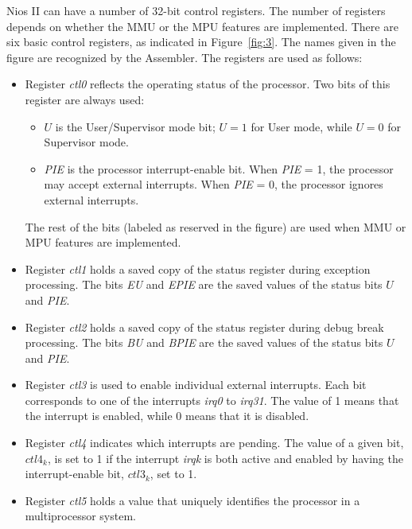\documentclass[11pt, twoside, pdftex]{article}
\begin{document}
Nios II can have a number of 32-bit control registers. The number of registers depends on 
whether the MMU or the MPU features are implemented. 
There are six basic control registers, as indicated in Figure~\ref{fig:3}. The names given in
the figure are recognized by the Assembler. 
The registers are used as follows:
\begin{itemize}
\item Register {\it ctl0} reflects the operating status of the processor.
Two bits of this register are always used:
\begin{itemize}
\item $U$ is the User/Supervisor mode bit; 
$U = 1$ for User mode, while $U = 0$ for Supervisor mode. 
\item {\it PIE} is the processor interrupt-enable bit. When {\it PIE} = 1, the processor
may accept external interrupts. When {\it PIE} = 0, the processor ignores external interrupts.
\end{itemize}
\noindent
The rest of the bits (labeled as reserved in the figure) are used when MMU or MPU features
are implemented.
\item Register {\it ctl1} holds a saved copy of the status register during exception
processing. The bits {\it EU} and {\it EPIE} are the saved values of the
status bits $U$ and {\it PIE}.
\item Register {\it ctl2} holds a saved copy of the status register during debug break
processing. The bits {\it BU} and {\it BPIE} are the saved values of the
status bits $U$ and {\it PIE}.
\item Register {\it ctl3} is used to enable individual external interrupts. Each bit
corresponds to one of the interrupts {\it irq0} to {\it irq31}. The value of 1 means 
that the interrupt is enabled, while 0 means that it is disabled.
\item Register {\it ctl4} indicates which interrupts are pending. The value of a given
bit, $ctl4_k$, is set to 1 if the interrupt {\it irqk} is both active and enabled by
having the interrupt-enable bit, $ctl3_k$, set to 1.  
\item Register {\it ctl5} holds a value that uniquely identifies the processor in
a multiprocessor system.
\end{itemize}
 
\end{document}
